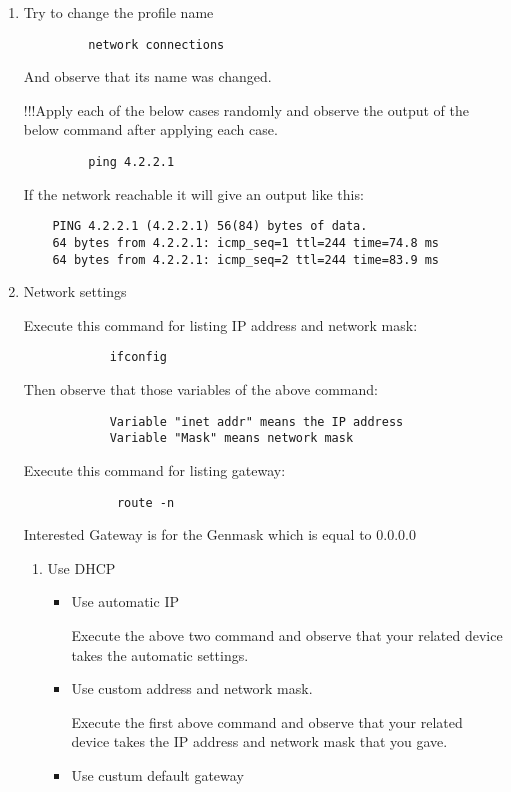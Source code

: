 \documentclass[a4paper,10pt]{article}
\begin{document}
\begin{enumerate}
\begin{enumerate}
	  \item Try to change the profile name
	    \begin{verbatim}
	     network connections
	    \end{verbatim}
	    And observe that its name was changed.

	\newpage    
    !!!Apply each of the below cases randomly and observe the output of the below command after applying each case.
		\begin{verbatim}
		 ping 4.2.2.1
		\end{verbatim}
	If the network reachable it will give an output like this:
	\begin{verbatim}
	PING 4.2.2.1 (4.2.2.1) 56(84) bytes of data.
	64 bytes from 4.2.2.1: icmp_seq=1 ttl=244 time=74.8 ms
	64 bytes from 4.2.2.1: icmp_seq=2 ttl=244 time=83.9 ms
      	\end{verbatim}

	  \item Network settings

	    Execute this command for listing IP address and network mask:
		  \begin{verbatim}
		    ifconfig
		  \end{verbatim}
	   Then observe that those variables of the above command:
		   \begin{verbatim}
		    Variable "inet addr" means the IP address
		    Variable "Mask" means network mask
		  \end{verbatim}
	   Execute this command for listing gateway:
	    	   \begin{verbatim}
		     route -n 
		  \end{verbatim}
	   Interested Gateway is for the Genmask which is equal to 0.0.0.0

	      \begin{enumerate} 
	      \item Use DHCP
		\begin{itemize}
		  \item Use automatic IP
				      
		   Execute the above two command and observe that your related device takes the automatic settings. 

		  \item Use custom address and network mask. 
		
		   Execute the first above command and observe that your related device takes the IP address and network mask that you gave.
  
		  \item Use custum default gateway
		     

\end{itemize}
\end{enumerate}
\end{enumerate}
\end{enumerate}
\end{document}
